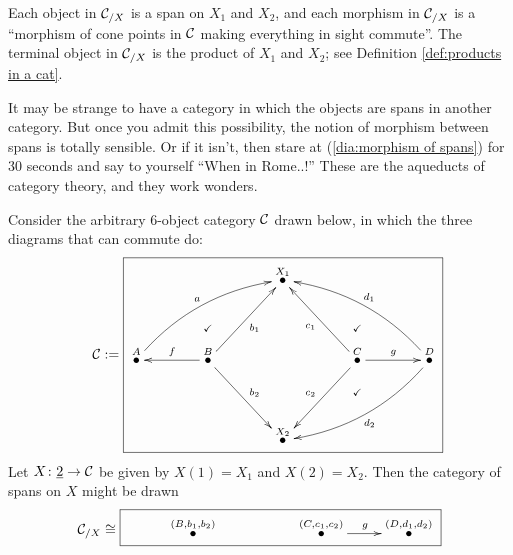 \documentclass[CT4S-EN-RU]{subfiles}
\begin{document}
\begin{constructionENG}[Products]
Each object in $\mathcal{C}_{/X}$ is a span on $X_1$ and $X_2$, and each morphism in $\mathcal{C}_{/X}$ is a “morphism of cone points in $\mathcal{C}$ making everything in sight commute”. The terminal object in $\mathcal{C}_{/X}$ is the product of $X_1$ and $X_2$; see Definition \ref{def:products in a cat}.
\end{constructionENG}

\begin{constructionRUS}[Products]
\end{constructionRUS}

\begin{blockENG}
It may be strange to have a category in which the objects are spans in another category. But once you admit this possibility, the notion of morphism between spans is totally sensible. Or if it isn't, then stare at (\ref{dia:morphism of spans}) for 30 seconds and say to yourself “When in Rome..!” These are the aqueducts of category theory, and they work wonders.
\end{blockENG}

\begin{blockRUS}
\end{blockRUS}

\begin{exampleENG}\label{ex:category of spans}
Consider the arbitrary 6-object category $\mathcal{C}$ drawn below, in which the three diagrams that can commute do:
$$\mcC:=\parbox{3in}{\fbox{\xymatrix@=39pt{&&\LMO{X_1}&\\\LMO{A}\ar@/^1pc/[urr]^a&\LMO{B}\ar[l]_f\ar@{}[u]|(.4){\checkmark}\ar[ur]_{b_1}\ar[dr]^{b_2}&&\LMO{C}\ar@{}[u]|(.4){\checkmark}\ar@{}[d]|(.4){\checkmark}\ar[ul]^{c_1}\ar[dl]_{c_2}\ar[r]^g&\LMO{D}\ar@/_1pc/[llu]_{d_1}\ar@/^1pc/[lld]^{d_2}\\&&\LMO{X_2}&}}}$$
Let $X\colon\underline{2}\rightarrow\mathcal{C}$ be given by $X(1)=X_1$ and $X(2)=X_2$. Then the category of spans on $X$ might be drawn
$$\mcC_{/X}\iso\fbox{\xymatrix{&\LMO{(B,b_1,b_2)}&&\LMO{(C,c_1,c_2)}\ar[r]^g&\LMO{(D,d_1,d_2)}}}$$
\end{exampleENG}

\begin{exampleRUS}\label{ex:category of spans}
\end{exampleRUS}


\subsubsection{}
\end{document}

